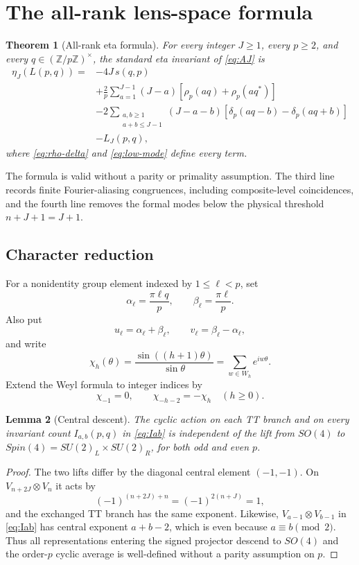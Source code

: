 \documentclass[11pt]{article}
\newtheorem{theorem}{Theorem}[section]
\newtheorem{lemma}[theorem]{Lemma}
\theoremstyle{definition}
\newcommand{\Z}{\mathbb Z}
\begin{document}
\section{The all-rank lens-space formula}
\label{sec:master}

\begin{theorem}[All-rank eta formula]
\label{thm:eta-master}
For every integer $J\geq1$, every $p\geq2$, and every
$q\in(\Z/p\Z)^\times$, the standard eta invariant of \eqref{eq:AJ} is
\begin{align}
\eta_J(L(p,q))={}&-4J\,s(q,p)\nonumber\\
&+\frac{2}{p}\sum_{a=1}^{J-1}(J-a)
  \left[\rho_p(aq)+\rho_p(aq^*)\right]\nonumber\\
&-2\!\!\sum_{\substack{a,b\geq1\\a+b\leq J-1}}
  (J-a-b)\left[\delta_p(aq-b)-\delta_p(aq+b)\right]\nonumber\\
&-L_J(p,q),
\label{eq:master-formula}
\end{align}
where \eqref{eq:rho-delta} and \eqref{eq:low-mode} define every term.
\end{theorem}

The formula is valid without a parity or primality assumption.  The third
line records finite Fourier-aliasing congruences, including composite-level
coincidences, and the fourth line removes the formal modes below the physical
threshold $n+J+1=J+1$.

\subsection{Character reduction}

For a nonidentity group element indexed by $1\leq\ell<p$, set
\[
 \alpha_\ell=\frac{\pi\ell q}{p},\qquad
 \beta_\ell=\frac{\pi\ell}{p}.
\]
Also put
\[
 u_\ell=\alpha_\ell+\beta_\ell,\qquad
 v_\ell=\beta_\ell-\alpha_\ell,
\]
and write
\[
 \chi_h(\theta)=\frac{\sin((h+1)\theta)}{\sin\theta}
 =\sum_{w\in W_h}e^{iw\theta}.
\]
Extend the Weyl formula to integer indices by
\[
 \chi_{-1}=0,\qquad \chi_{-h-2}=-\chi_h\quad(h\geq0).
\]
\begin{lemma}[Central descent]
\label{lem:central-descent}
The cyclic action on each TT branch and on every invariant count
$I_{a,b}(p,q)$ in \eqref{eq:Iab} is independent of the lift from $SO(4)$ to
$Spin(4)=SU(2)_L\times SU(2)_R$, for both odd and even $p$.
\end{lemma}

\begin{proof}
The two lifts differ by the diagonal central element $(-1,-1)$.  On
$V_{n+2J}\otimes V_n$ it acts by
\[
 (-1)^{(n+2J)+n}=(-1)^{2(n+J)}=1,
\]
and the exchanged TT branch has the same exponent.  Likewise,
$V_{a-1}\otimes V_{b-1}$ in \eqref{eq:Iab} has central exponent $a+b-2$,
which is even because $a\equiv b\pmod2$.  Thus all representations entering
the signed projector descend to $SO(4)$ and the order-$p$ cyclic average is
well-defined without a parity assumption on $p$.
\end{proof}
\end{document}
